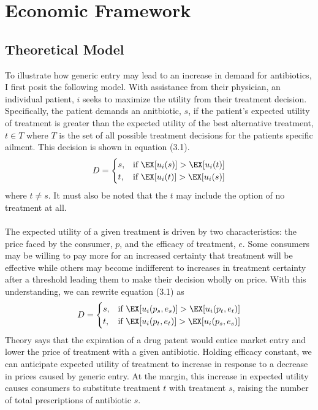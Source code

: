 \chapter{Economic Framework}
\section{Theoretical Model}
To illustrate how generic entry may lead to an increase in demand for antibiotics, I first posit the following model. With assistance from their physician, an individual patient, $i$ seeks to maximize the utility from their treatment decision. Specifically, the patient demands an anitbiotic, $s$, if the patient's expected utility of treatment is greater than the expected utility of the best alternative treatment, $t \in T$ where $T$ is the set of all possible treatment decisions for the patients specific ailment. This decision is shown in equation (3.1).
\begin{eqnarray}
  D =
  \begin{cases}
                                   s, & \text{if }\EX[u_i(s)] > \EX[u_i(t)] \\
                                   t, & \text{if }\EX[u_i(t)] > \EX[u_i(s)] \\
  \end{cases}
\end{eqnarray}
where $t \neq s$. It must also be noted that the $t$ may include the option of no treatment at all.\\
\\
\indent The expected utility of a given treatment is driven by two characteristics: the price faced by the consumer, $p$, and the efficacy of treatment, $e$. Some consumers may be willing to pay more for an increased certainty that treatment will be effective while others may become indifferent to increases in treatment certainty after a threshold leading them to make their decision wholly on price. With this understanding, we can rewrite equation (3.1) as
\begin{eqnarray}
  D =
  \begin{cases}
                                   s, & \text{if }\EX[u_i(p_s,e_s)] > \EX[u_i(p_t,e_t)] \\
                                   t, & \text{if }\EX[u_i(p_t,e_t)] > \EX[u_i(p_s,e_s)] \\
  \end{cases}
\end{eqnarray}
 \indent Theory says that the expiration of a drug patent would entice market entry and lower the price of treatment with a given antibiotic. Holding efficacy constant, we can anticipate expected utility of treatment to increase in response to a decrease in prices caused by generic entry. At the margin, this increase in expected utility causes consumers to substitute treatment $t$ with treatment $s$, raising the number of total prescriptions of antibiotic $s$.
